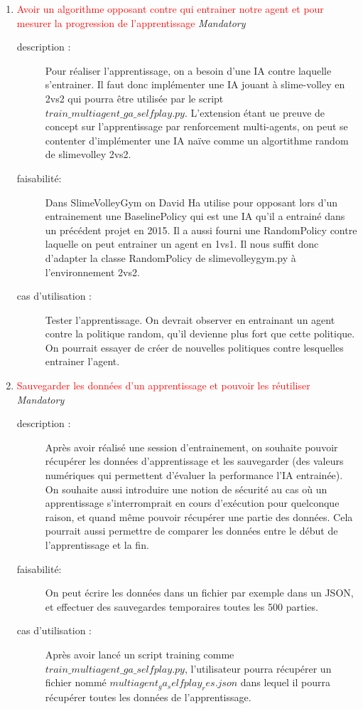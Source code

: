 \documentclass[11pt, a4paper]{article}
\newcommand{\besoinVItem}[4]{
	\item #1
	\begin{description}
		\item[description :]
		#2
		\item[faisabilité: ]
		#3
		\item[cas d'utilisation :]
		#4
	\end{description}
}
\begin{document}
\begin{enumerate}
		\besoinVItem{\textcolor{red}{Avoir un algorithme opposant contre qui entrainer notre agent et pour mesurer la progression de l'apprentissage} \textit{Mandatory}}
		{
			Pour réaliser l'apprentissage, on a besoin d'une IA contre laquelle s'entrainer. Il faut donc implémenter une IA jouant à slime-volley en 2vs2 qui pourra être utilisée par le script $train\_multiagent\_ga\_selfplay.py$. L'extension étant ue preuve de concept sur l'apprentissage par renforcement multi-agents, on peut se contenter d'implémenter une IA naïve comme un algortithme random de slimevolley 2vs2. \label{opposant}
		}
		{
			Dans SlimeVolleyGym on David Ha utilise pour opposant lors d'un entrainement une BaselinePolicy qui est une IA qu'il a entrainé dans un précédent projet en 2015. Il a aussi fourni une RandomPolicy contre laquelle on peut entrainer un agent en 1vs1. Il nous suffit donc d'adapter la classe RandomPolicy de slimevolleygym.py à l'environnement 2vs2.
		}
		{
			Tester l'apprentissage. On devrait observer en entrainant un agent contre la politique random, qu'il devienne plus fort que cette politique. On pourrait essayer de créer de nouvelles politiques contre lesquelles entrainer l'agent.
		}

		\besoinVItem{\textcolor{red}{Sauvegarder les données d'un apprentissage  et pouvoir les réutiliser} \textit{Mandatory}}
		{
			Après avoir réalisé une session d'entrainement, on souhaite pouvoir récupérer les données d'apprentissage et les sauvegarder (des valeurs numériques qui permettent d'évaluer la performance l'IA entrainée). On souhaite aussi introduire une notion de sécurité au cas où un apprentissage s'interromprait en cours d'exécution pour quelconque raison, et quand même pouvoir récupérer une partie des données. Cela pourrait aussi permettre  de comparer les données entre le début de l'apprentissage et la fin. \label{sauvegarde}
		}
		{
			On peut écrire les données dans un fichier par exemple dans un JSON, et effectuer des sauvegardes temporaires toutes les 500 parties.
		}
		{
			Après avoir lancé un script training comme $train\_multiagent\_ga\_selfplay.py$, l'utilisateur pourra récupérer un fichier nommé $multiagent_ga_selfplay_res.json$ dans lequel il pourra récupérer toutes les données de l'apprentissage.
		}


\end{enumerate}
\end{document}
